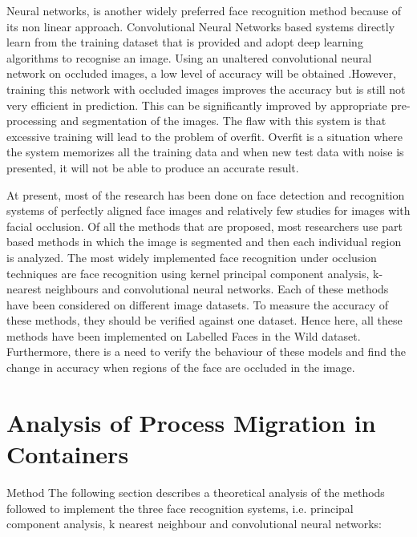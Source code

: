 \documentclass[conference]{IEEEtran}
\begin{document}
Neural networks, is another widely preferred face recognition method because of its non linear approach. Convolutional Neural Networks based systems directly learn from the training dataset that is provided and adopt deep learning algorithms to recognise an image. Using an unaltered convolutional neural network on occluded images, a low level of accuracy will be obtained \cite{chandler2016mitigation}.However, training this network with occluded images improves the accuracy but is still not very efficient in prediction. This can be significantly improved by appropriate pre-processing and segmentation of the images. The flaw with this system is that excessive training will lead to the problem of overfit. Overfit is a situation where the system memorizes all the training data and when new test data with noise is presented, it will not be able to produce an accurate result.

At present, most of the research has been done on face detection and recognition systems of perfectly aligned face images and relatively few studies for images with facial occlusion. Of all the methods that are proposed, most researchers use part based methods in which the image is segmented and then each individual region is analyzed. The most widely implemented face recognition under occlusion techniques are face recognition using kernel principal component analysis, k-nearest neighbours and convolutional neural networks. Each of these methods have been considered on different image datasets. To measure the accuracy of these methods, they should be verified against one dataset. Hence here, all these methods have been implemented on Labelled Faces in the Wild dataset. Furthermore, there is a need to verify the behaviour of these models and find the change in accuracy when regions of the face are occluded in the image.





\section{Analysis of Process Migration in Containers}
\label{sec:3 Analysis Process Migration} 
Method
The following section describes a theoretical analysis of the methods followed to implement the three face recognition systems, i.e. principal component analysis, k nearest neighbour and convolutional neural networks:



 
\end{document}
